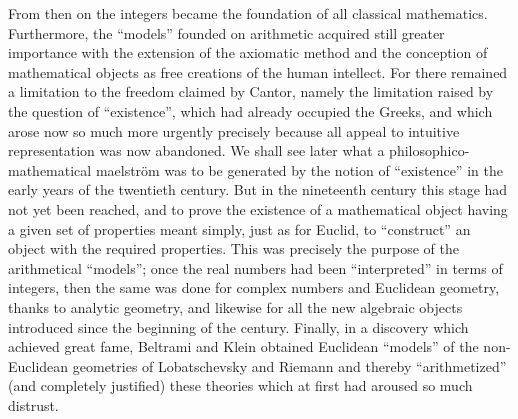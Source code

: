 From then on the integers became the foundation of all classical mathematics. Furthermore, the ``models'' founded on arithmetic acquired still greater importance with the extension of the axiomatic method and the conception of mathematical objects as free creations of the human intellect. For there remained a limitation to the freedom claimed by Cantor, namely the limitation raised by the question of ``existence'', which had already occupied the Greeks, and which arose now so much more urgently precisely because all appeal to intuitive representation was now abandoned. We shall see later what a philosophico-mathematical maelström was to be generated by the notion of ``existence'' in the early years of the twentieth century. But in the nineteenth century this stage had not yet been reached, and to prove the existence of a mathematical object having a given set of properties meant simply, just as for Euclid, to ``construct'' an object with the required properties. This was precisely the purpose of the arithmetical ``models''; once the real numbers had been ``interpreted'' in terms of integers, then the same was done for complex numbers and Euclidean geometry, thanks to analytic geometry, and likewise for all the new algebraic objects introduced since the beginning of the century. Finally, in a discovery which achieved great fame, Beltrami and Klein obtained Euclidean ``models'' of the non-Euclidean geometries of Lobatschevsky and Riemann and thereby ``arithmetized'' (and completely justified) these theories which at first had aroused so much distrust.

